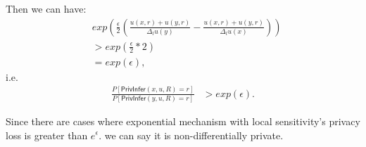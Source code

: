 \documentclass{article}
\begin{document}
Then we can have:
\begin{equation*}
\begin{split}
& exp(\frac{\epsilon}{2} (\frac{u(x,r) + u(y,r)}{\Delta_{l}u(y)} - \frac{u(x,r) + u(y,r)}{\Delta_{l}u(x)}))\\
& > exp(\frac{\epsilon}{2} * 2) \\
& = exp(\epsilon),
\end{split}
\end{equation*}
i.e.
\begin{equation*}
\begin{split}
\frac{P[\mathsf{PrivInfer}(x,u,R) = r]}{P[\mathsf{PrivInfer}(y,u,R) = r]}
& > exp(\epsilon).
\end{split}
\end{equation*}

Since there are cases where exponential mechanism with local sensitivity's privacy loss is greater than $e^{\epsilon}$. we can say it is non-differentially private.

\end{document}
